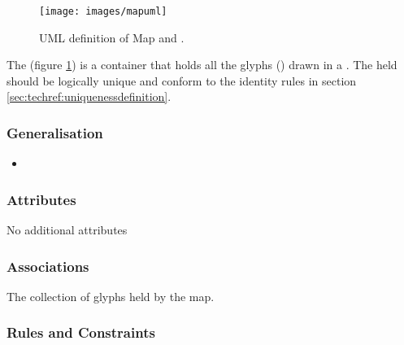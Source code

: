 \begin{figure}[htb]
  \centering
  \texttt{[image: images/mapuml]}
  \caption{UML definition of Map and .}
  \label{fig:techref:mapuml}
\end{figure}

The  (figure \ref{fig:techref:mapuml}) is a container that
holds all the glyphs () drawn in a \PDm. The
 held should be logically unique and conform to the
identity rules in section \ref{sec:techref:uniquenessdefinition}.


\subsubsection{Generalisation}

\begin{itemize}
\item {}
\end{itemize}

\subsubsection{Attributes}

No additional attributes

\subsubsection{Associations}

\begin{attributes}
 The collection of glyphs held by the map.
\end{attributes}

\subsubsection{Rules and Constraints}

\begin{valrules}
\end{valrules}


